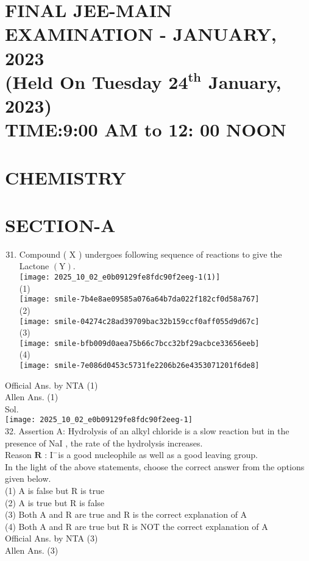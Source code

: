 \documentclass[10pt]{article}
\begin{document}
\captionsetup{singlelinecheck=false}
\section*{FINAL JEE-MAIN EXAMINATION - JANUARY, 2023 \\
 (Held On Tuesday \(\mathbf{2 4}^{\boldsymbol{t h}}\) January, 2023) \\
 TIME:9:00 AM to 12: 00 NOON}
\section*{CHEMISTRY}
\section*{SECTION-A}
\begin{enumerate}
  \setcounter{enumi}{30}
  \item Compound ( X ) undergoes following sequence of reactions to give the Lactone \((\mathrm{Y})\).\\
\texttt{[image: 2025\_10\_02\_e0b09129fe8fdc90f2eeg-1(1)]}\\
(1)\\
\texttt{[image: smile-7b4e8ae09585a076a64b7da022f182cf0d58a767]}\\
(2)\\
\texttt{[image: smile-04274c28ad39709bac32b159ccf0aff055d9d67c]}\\
(3)\\
\texttt{[image: smile-bfb009d0aea75b66c7bcc32bf29acbce33656eeb]}\\
(4)\\
\texttt{[image: smile-7e086d0453c5731fe2206b26e4353071201f6de8]}
\end{enumerate}

Official Ans. by NTA (1)\\
Allen Ans. (1)\\
Sol.\\
\texttt{[image: 2025\_10\_02\_e0b09129fe8fdc90f2eeg-1]}\\
32. Assertion A: Hydrolysis of an alkyl chloride is a slow reaction but in the presence of NaI , the rate of the hydrolysis increases.\\
Reason \(\mathbf{R}\) : \(\mathrm{I}^{-}\)is a good nucleophile as well as a good leaving group.\\
In the light of the above statements, choose the correct answer from the options given below.\\
(1) A is false but R is true\\
(2) A is true but R is false\\
(3) Both A and R are true and R is the correct explanation of A\\
(4) Both A and R are true but R is NOT the correct explanation of A\\
Official Ans. by NTA (3)\\
Allen Ans. (3)
\end{document}
